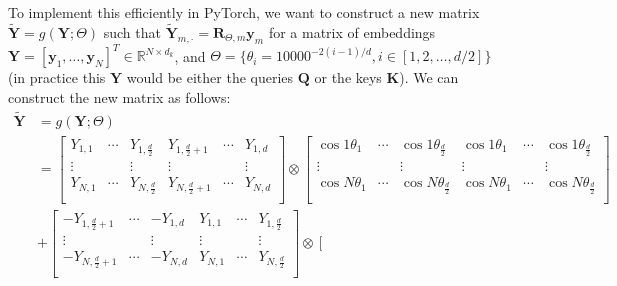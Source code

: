 \documentclass[11pt,addpoints,answers]{exam}
\newcommand{\Rb}{\mathbb{R}}
\newcommand{\yv}{\mathbf{y}}
\newcommand{\Kv}{\mathbf{K}}
\newcommand{\Qv}{\mathbf{Q}}
\newcommand{\Rv}{\mathbf{R}}
\newcommand{\Yv}{\mathbf{Y}}
\begin{document}
\begin{questions}
    To implement this efficiently in PyTorch, we want to construct a new matrix $\tilde{\Yv} = g(\Yv; \Theta)$ such that $\tilde{\Yv}_{m, \cdot} = \Rv_{\Theta,m} \yv_m$ for a matrix of embeddings $\Yv = [\yv_1, \ldots, \yv_N]^T \in \Rb^{N \times d_k}$, and $\Theta = \{\theta_i = 10000^{-2(i-1)/d}, i \in [1, 2, \ldots, d/2]\}$ (in practice this $\Yv$ would be either the queries $\Qv$ or the keys $\Kv$). We can construct the new matrix as follows:
    {\small 
    \begin{align*}
        \tilde{\Yv} &= g(\Yv; \Theta) \\
        &= \left[ \begin{array}{ccc|ccc} 
            Y_{1,1} & \cdots & Y_{1,\frac{d}{2}} & Y_{1,\frac{d}{2}+1} & \cdots & Y_{1,d} \\
            \vdots & & \vdots & \vdots & & \vdots \\
            Y_{N,1} & \cdots & Y_{N,\frac{d}{2}} & Y_{N,\frac{d}{2}+1} & \cdots & Y_{N,d} \\
        \end{array} \right] 
        \otimes
        \left[ \begin{array}{ccc|ccc} 
            \cos 1 \theta_1 & \cdots & \cos 1 \theta_{\frac{d}{2}} & \cos 1 \theta_1 & \cdots & \cos 1 \theta_{\frac{d}{2}} \\
            \vdots & & \vdots & \vdots & & \vdots \\
            \cos N \theta_1 & \cdots & \cos N \theta_{\frac{d}{2}} & \cos N \theta_1 & \cdots & \cos N \theta_{\frac{d}{2}} \\
        \end{array} \right] 
        \\
        &+\left[ \begin{array}{ccc|ccc} 
            -Y_{1,\frac{d}{2}+1} & \cdots & -Y_{1,d} & Y_{1,1} & \cdots & Y_{1,\frac{d}{2}} \\
            \vdots & & \vdots & \vdots & & \vdots \\
            -Y_{N,\frac{d}{2}+1} & \cdots & -Y_{N,d} & Y_{N,1} & \cdots & Y_{N,\frac{d}{2}}  \\
        \end{array} \right] 
        \otimes
        \left[ \begin{array}{ccc|ccc} 

\end{array}
\end{align*}}
\end{questions}
\end{document}
